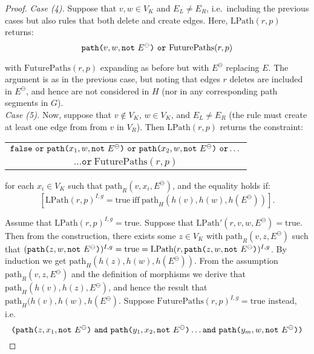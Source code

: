 \documentclass{llncs}
\newcommand{\mt}[1]{\text{\tt{#1}}}
\begin{document}
\begin{proof}
		
		\noindent\emph{Case (4).} Suppose that $v,w\in V_K$ and $E_L \neq E_R$, i.e.\ including the previous cases but also rules that both delete and create edges. Here, $\text{LPath}(r,p)$ returns:
		\[ \mathtt{path}\mt{(}v,w,\mathtt{not}\ E^\ominus\mt{)}\ \mathtt{or}\ \text{FuturePaths}(r,p) \]
		
		\noindent with $\text{FuturePaths}(r,p)$ expanding as before but with $E^\ominus$ replacing $E$. The argument is as in the previous case, but noting that edges $r$ deletes are included in $E^\ominus$, and hence are not considered in $H$ (nor in any corresponding path segments in $G$).\\
		
		\noindent\emph{Case (5).} Now, suppose that $v\notin V_K$, $w\in V_K$, and $E_L \neq E_R$ (the rule must create at least one edge from from $v$ in $V_R$). Then $\text{LPath}(r,p)$ returns the constraint:
		
		\begin{center}\begin{tabular}{c}
			$\mathtt{false\ or}\ \mathtt{path}\mt{(}x_1,w,\mathtt{not}\ E^\ominus\mt{)}\ \mathtt{or}\ \mathtt{path}\mt{(}x_2,w,\mathtt{not}\ E^\ominus\mt{)}\ \mathtt{or}\dots$\\
		 $\dots \mathtt{or}\ \text{FuturePaths}(r,p)$
		\end{tabular}\end{center}
		
		\noindent for each $x_i \in V_K$ such that $\text{path}_R(v,x_i,E^\ominus)$, and the equality holds if: \[\left[\text{LPath}(r,p)^{I,g}= \text{true} \ \text{iff}\ \text{path}_H(h(v),h(w),h(E^\ominus))\right].\]
		
		\noindent Assume that $\text{LPath}(r,p)^{I,g} = \text{true}$. Suppose that $\text{LPath}'(r,v,w,E^\ominus) = \text{true}$. Then from the construction, there exists some $z\in V_K$ with $\text{path}_R(v,z,E^\ominus)$ such that $(\mathtt{path}\mt{(}z,w,\mathtt{not}\ E^\ominus\mt{)})^{I,g}=\text{true}=\text{LPath}(r,\mathtt{path}\mt{(}z,w,\mathtt{not}\ E^\ominus\mt{)})^{I,g}$. By induction we get $\text{path}_H(h(z),h(w),h(E^\ominus))$. From the assumption $\text{path}_R(v,z,E^\ominus)$ and the definition of morphisms we derive that $\text{path}_H(h(v),h(z),E^\ominus)$, and hence the result that $\text{path}_H(h(v),h(w),h(E^\ominus)$. Suppose $\text{FuturePaths}(r,p)^{I,g} = \text{true}$ instead, i.e. 
		\[ \mt{(}\mathtt{path}\mt{(}z,x_1,\mathtt{not}\ E^\ominus\mt{)}\ \mathtt{and}\ \mathtt{path}\mt{(}y_1,x_2,\mathtt{not}\ E^\ominus\mt{)} \dots \mathtt{and}\ \mathtt{path}\mt{(}y_m,w,\mathtt{not}\ E^\ominus\mt{)}\mt{)} \]
		

\end{proof}
\end{document}
